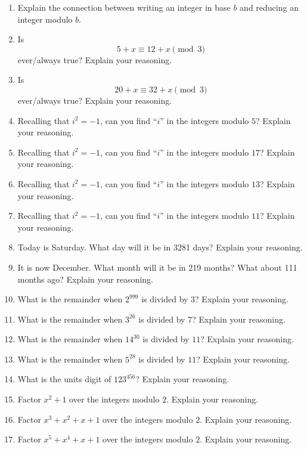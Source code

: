 \begin{problems}
\begin{enumerate}
\item Explain the connection between writing an integer in base $b$ and
  reducing an integer modulo $b$.

\item Is 
\[
5 + x \equiv 12 + x \pmod{3}
\]
ever/always true? Explain your reasoning.
\item Is 
\[
20 + x \equiv 32 + x \pmod{3}
\]
ever/always true? Explain your reasoning.

\item Recalling that $i^2 = -1$, can you find ``$i$'' in the
  integers modulo $5$?  Explain your reasoning.
\item Recalling that $i^2 = -1$, can you find ``$i$'' in the
  integers modulo $17$?
  Explain your reasoning.
\item Recalling that $i^2 = -1$, can you find ``$i$'' in the
  integers modulo $13$?
  Explain your reasoning.
\item Recalling that $i^2 = -1$, can you find ``$i$'' in the
  integers modulo $11$?  Explain your reasoning.


\item Today is Saturday. What day will it be in 3281 days? Explain
  your reasoning.
\item It is now December. What month will it be in 219 months? What
  about 111 months ago? Explain your reasoning.
\item What is the remainder when $2^{999}$ is divided by $3$? Explain
  your reasoning.
\item What is the remainder when $3^{26}$ is divided by $7$? Explain
  your reasoning.
\item What is the remainder when $14^{30}$ is divided by $11$? Explain
  your reasoning.
\item What is the remainder when $5^{28}$ is divided by $11$? Explain
  your reasoning.
\item What is the units digit of $123^{456}$? Explain your reasoning.

\item Factor $x^2 + 1$ over the integers modulo $2$. Explain your
  reasoning.
\item Factor $x^3 +x^2 +x+1$ over the integers modulo $2$. Explain your
  reasoning.
\item Factor $x^5 +x^4 +x+1$ over the integers modulo $2$. Explain your
  reasoning.

\end{enumerate}
\end{problems}






